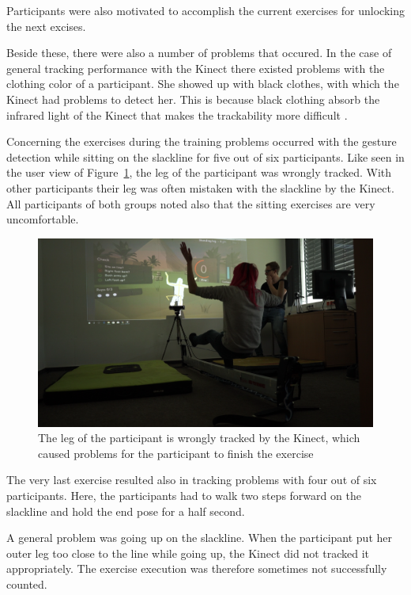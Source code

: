 Participants were also motivated to accomplish the current exercises for unlocking the next excises.

Beside these, there were also a number of problems that occured.
In the case of general tracking performance with the Kinect there existed problems with the clothing color of a participant.
She showed up with black clothes, with which the Kinect had problems to detect her.
This is because black clothing absorb the infrared light of the Kinect that makes the trackability more difficult \cite{KinectBlackClothing}.

Concerning the exercises during the training problems occurred with the gesture detection while sitting on the slackline for five out of six participants.
Like seen in the user view of Figure~\ref{fig:6_5_sittingProblems}, the leg of the participant was wrongly tracked.
With other participants their leg was often mistaken with the slackline by the Kinect.
All participants of both groups noted also that the sitting exercises are very uncomfortable.
\begin{figure}[htb]
	\centering
	\includegraphics[width=0.97\linewidth]{Pictures/6_5_sitting}
	\caption{The leg of the participant is wrongly tracked by the Kinect, which caused problems for the participant to finish the exercise}
	\label{fig:6_5_sittingProblems}
\end{figure}

The very last exercise resulted also in tracking problems with four out of six participants.
Here, the participants had to walk two steps forward on the slackline and hold the end pose for a half second.

A general problem was going up on the slackline.
When the participant put her outer leg too close to the line while going up, the Kinect did not tracked it appropriately.
The exercise execution was therefore sometimes not successfully counted.

